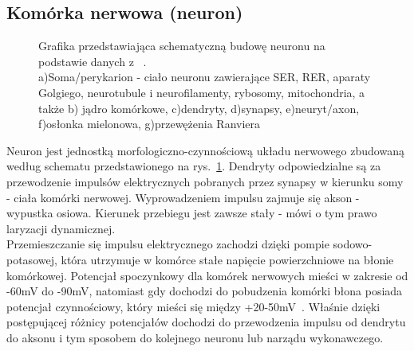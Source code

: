 \documentclass[twoside,a4paper]{book}
\begin{document}
\subsection{Komórka nerwowa (neuron)}
\begin{figure}[!h]

		\centering		
		\caption{Grafika przedstawiająca schematyczną budowę neuronu na podstawie danych z ~\cite{neurology}.\\ 
		a)Soma/perykarion - ciało neuronu zawierające SER, RER, aparaty Golgiego, neurotubule i neurofilamenty, rybosomy, mitochondria, a także b) jądro komórkowe, c)dendryty, d)synapsy, e)neuryt/axon, f)osłonka mielonowa, g)przewężenia Ranviera  }
		\label{fig:neuron}
	\end{figure}
	Neuron jest jednostką morfologiczno-czynnościową układu nerwowego zbudowaną według schematu przedstawionego na  rys.~\ref{fig:neuron}. Dendryty odpowiedzialne są za przewodzenie impulsów elektrycznych pobranych przez synapsy w kierunku somy - ciała komórki nerwowej. Wyprowadzeniem impulsu zajmuje się akson - wypustka osiowa. Kierunek przebiegu jest zawsze stały  - mówi o tym prawo laryzacji dynamicznej. ~\cite{anatomy}\\ 
Przemieszczanie się impulsu elektrycznego zachodzi dzięki pompie sodowo-potasowej, która utrzymuje w komórce stałe napięcie powierzchniowe na błonie komórkowej. Potencjał spoczynkowy dla komórek nerwowych mieści w zakresie od -60mV do -90mV, natomiast gdy dochodzi do pobudzenia komórki błona posiada potencjał czynnościowy, który mieści się między +20-50mV~\cite{neurology}. Właśnie dzięki postępującej różnicy potencjałów dochodzi do przewodzenia impulsu od dendrytu do aksonu i tym sposobem do kolejnego neuronu lub narządu wykonawczego.
\end{document}
